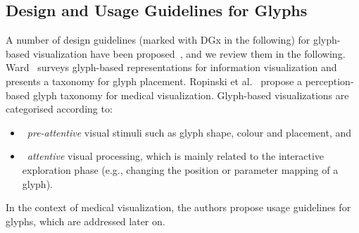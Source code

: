 \subsection{Design and Usage Guidelines for Glyphs}
A number of design guidelines (marked with DGx in the following) for glyph-based visualization have been proposed~\cite{ward02glyphPlacement, ward08glyphs, ropinskiPreim08glyphTaxonomy, lie09glyphs, Ropinski11glyphs, Maguire:2012:TVCG}, and we review them in the following.
Ward~\cite{ward02glyphPlacement} surveys glyph-based representations for information visualization
and presents a taxonomy for glyph placement.
Ropinski et al.~\cite{ropinskiPreim08glyphTaxonomy, Ropinski11glyphs} propose a per\-ception-based glyph taxonomy for medical visualization.
Glyph-based visualizations are categorised according to: 
\begin{itemize}
\item ~\emph{pre-attentive} visual stimuli such as glyph shape, colour and placement, and 
\item ~\emph{attentive} visual processing, which is mainly related to the interactive exploration phase 
(e.g., changing the position or parameter mapping of a glyph).
\end{itemize}
In the context of medical visualization, the authors propose %
usage guidelines for glyphs, which are addressed later on.


